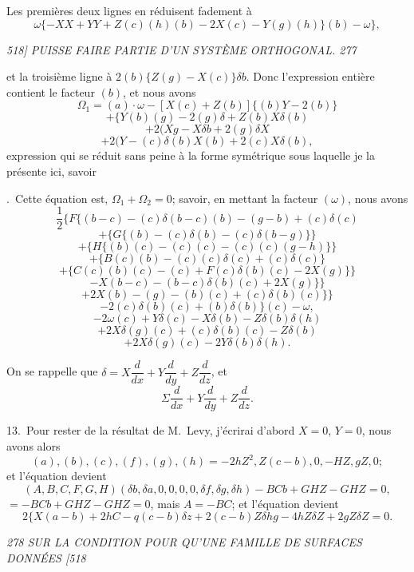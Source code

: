 \documentclass[11pt,a4paper]{book}
\begin{document}
\noindent
Les premi\`eres deux lignes en r\'eduisent fadement \`a
\[
\omega \{- X X + Y Y + Z(c) (h)(b) - 2X(c) - Y(g)(h)\}(b) - \omega\},
\]

\clearpage

\noindent\textit{518] \hfill PUISSE FAIRE PARTIE D'UN SYST\`EME ORTHOGONAL. \hfill 277}

\medskip

et la troisi\`eme ligne \`a $2(b)\{Z(g) - X(c)\}\delta b$. Donc l'expression enti\`ere contient le
facteur $(b)$, et nous avons
\[
\Omega_1 = (a) \cdot \omega - [X(c) + Z(b)] \{(b)Y - 2(b)\}
\]
\[
+ \{Y(b)(g) - 2(g)\delta + Z(b)X\delta(b)
\]
\[
+ 2(X g - X \delta b + 2(g)\delta X
\]
\[
+ 2(Y - (c)\delta(b) X (b) + 2(c)X\delta(b),
\]
expression qui se r\'eduit sans peine \`a la forme sym\'etrique sous laquelle je la pr\'esente
ici, savoir
\medskip

.~Cette \'equation est, $\Omega_1 + \Omega_2 = 0$; savoir, en mettant la facteur $(\omega)$, nous avons
\[
\frac{1}{2}\{F\{(b - c) - (c)\delta(b - c)(b) - (g - b) + (c)\delta(c)
\]
\[
+ \{G\{(b) - (c)\delta(b) - (c)\delta(b - g)\}\}
\]
\[
+ \{H\{(b)(c) - (c)(c) - (c)(c)(g - h)\}\}
\]
\[
+ \{B(c)(b) - (c)(c)\delta(c) + (c)\delta(c)\}
\]
\[
+ \{C(c)(b)(c) - (c) + F(c)\delta(b)(c) - 2X(g)\}\}
\]
\[
- X(b - c) - (b - c)\delta(b)(c) + 2X(g)\}\}
\]
\[
+ 2X(b) - (g) - (b)(c) + (c)\delta(b)(c)\}\}
\]
\[
- 2(c)\delta(b)(c) + (b)\delta(b)\}(c) - \omega,
\]
\[
- 2 \omega(c) + Y\delta(c) - X\delta(b) - Z\delta(b)\delta(h)
\]
\[
+ 2X\delta(g)(c) + (c)\delta(b)(c) - Z\delta(b)
\]
\[
+ 2X\delta(g)(c) - 2Y\delta(b)\delta(h).
\]

On se rappelle que $\delta = X\dfrac{d}{dx} + Y\dfrac{d}{dy} + Z\dfrac{d}{dz}$, et
\[
\Sigma\dfrac{d}{dx} + Y\dfrac{d}{dy} + Z\dfrac{d}{dz}.
\]

13.~Pour rester de la r\'esultat de M.~Levy, j'\'ecrirai d'abord $X = 0$, $Y = 0$, nous
avons alors
\[
(a), (b), (c), (f), (g), (h) = - 2hZ^2, Z(c - b), 0, - HZ, gZ, 0;
\]
et l'\'equation devient
\[
(A, B, C, F, G, H)(\delta b, \delta a, 0, 0, 0, 0, \delta f, \delta g, \delta h) - BCb + GHZ - GHZ = 0,
\]
$= -BCb + GHZ - GHZ = 0$, mais $A = -BC$;
et l'\'equation devient
\[
2\{X(a - b) + 2hC - q(c - b)\delta z + 2(c - b)Z\delta hg - 4hZ\delta Z + 2gZ\delta Z = 0.
\]

\clearpage

\noindent\textit{278 \hfill SUR LA CONDITION POUR QU'UNE FAMILLE DE SURFACES DONN\'EES \hfill [518}
\end{document}
